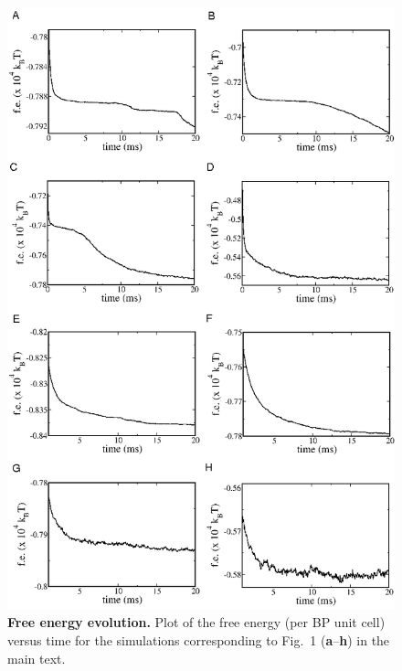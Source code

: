 \documentclass[12pt,twoside]{article}
\begin{document}
\begin{figure}[!h]
\begin{center}
\includegraphics[scale=0.49]{support-fig4.png}
\end{center}
\caption{\textbf{Free energy evolution.}
Plot of the free energy (per BP unit cell) versus time
for the simulations corresponding to Fig.~1 (\textbf{a}--\textbf{h})
in the main text.}
\end{figure}

\newpage
\end{document}
